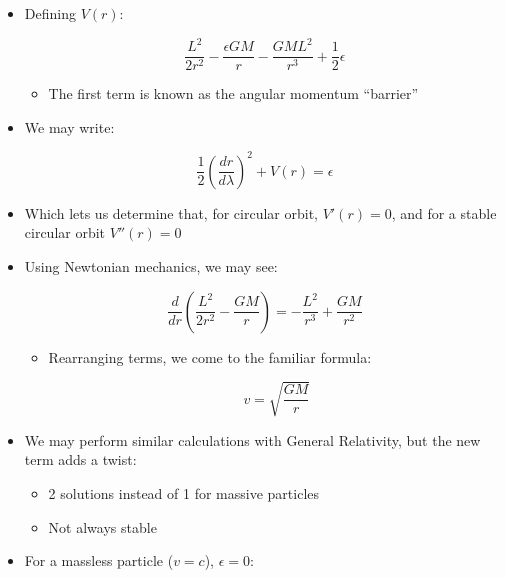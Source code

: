 \begin{itemize}
    \begin{itemize}

      \item Defining $V(r)$:

        $$\frac{L^2}{2r^2}-\frac{\epsilon GM}{r}-\frac{GML^2}{r^3}+\frac{1}{2}\epsilon$$

        \begin{itemize}

          \item The first term is known as the angular momentum ``barrier''

        \end{itemize}

      \item We may write:

        $$\frac{1}{2}\left( \frac{dr}{d\lambda} \right)^2+V(r)=\epsilon$$

      \item Which lets us determine that, for circular orbit, $V'(r)=0$, and for a stable circular orbit $V''(r)=0$

      \item Using Newtonian mechanics, we may see:

        $$\frac{d}{dr}\left( \frac{L^2}{2r^2}-\frac{GM}{r} \right)=-\frac{L^2}{r^3}+\frac{GM}{r^2}$$

        \begin{itemize}

          \item Rearranging terms, we come to the familiar formula:

            $$v=\sqrt{\frac{GM}{r}}$$

        \end{itemize}

      \item We may perform similar calculations with General Relativity, but the new term adds a twist:

        \begin{itemize}

          \item 2 solutions instead of 1 for massive particles

          \item Not always stable

        \end{itemize}

      \item For a massless particle ($v=c$), $\epsilon=0$:


\end{itemize}
\end{itemize}
